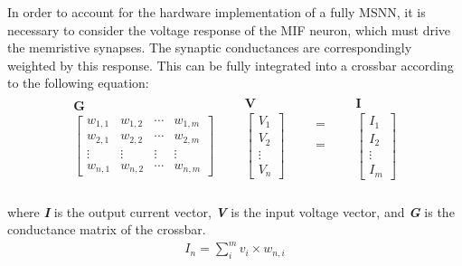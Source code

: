 \noindent In order to account for the hardware implementation of a fully MSNN, it is necessary to consider the voltage response of the MIF neuron, which must drive the memristive synapses. The synaptic conductances are correspondingly weighted by this response. This can be fully integrated into a crossbar according to the following equation:
\begin{align}
\begin{matrix}
& \textbf{G} & \\
& \begin{bmatrix}
    w_{1,1} & w_{1,2} & \cdots & w_{1, m} \\
    w_{2,1} & w_{2,2} & \cdots & w_{2, m} \\
    \vdots & \vdots & \vdots & \vdots \\
    w_{n, 1} & w_{n, 2} & \cdots & w_{n, m}
\end{bmatrix} &\\
\end{matrix}
\begin{matrix}
  & \textbf{V} & \\
 & \begin{bmatrix}
V_{1} \\
V_{2} \\
\vdots \\
V_{n}
\end{bmatrix} &\\
\end{matrix}
\begin{matrix}
 & = & \\
\\
\\
&=&  \\
\\
\end{matrix}
\begin{matrix}
  & \textbf{I} & \\
 & \begin{bmatrix}
I_{1} \\
I_{2} \\
\vdots \\
I_{m}
\end{bmatrix} &\\
\end{matrix}
\label{eq:6.15}
\end{align}


\noindent where \textbf{\textit{I}} is the output current vector, \textbf{\textit{V}} is the input voltage vector, and \textbf{\textit{G}} is the conductance matrix of the crossbar.
\begin{align}
I_n = \sum_{i}^{m} v_i \times w_{n,i} \label{eq:6.16}
\end{align}


